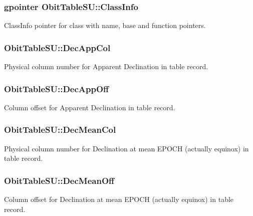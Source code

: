 \subsubsection{\setlength{\rightskip}{0pt plus 5cm}gpointer {\bf Obit\-Table\-SU::Class\-Info}}\label{structObitTableSU_o1}


Class\-Info pointer for class with name, base and function pointers. 

\subsubsection{ {\bf Obit\-Table\-SU::Dec\-App\-Col}}\label{structObitTableSU_o34}


Physical column number for Apparent Declination in table record. 

\subsubsection{ {\bf Obit\-Table\-SU::Dec\-App\-Off}}\label{structObitTableSU_o33}


Column offset for Apparent Declination in table record. 

\subsubsection{ {\bf Obit\-Table\-SU::Dec\-Mean\-Col}}\label{structObitTableSU_o28}


Physical column number for Declination at mean EPOCH (actually equinox) in table record. 

\subsubsection{ {\bf Obit\-Table\-SU::Dec\-Mean\-Off}}\label{structObitTableSU_o27}


Column offset for Declination at mean EPOCH (actually equinox) in table record. 

